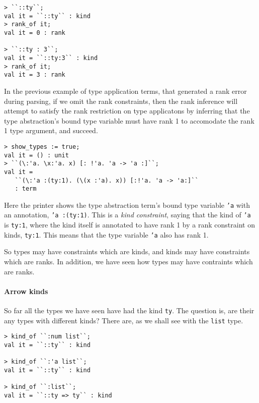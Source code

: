 \begin{session}
\begin{verbatim}
> ``::ty``;
val it = ``::ty`` : kind
> rank_of it;
val it = 0 : rank

> ``::ty : 3``;
val it = ``::ty:3`` : kind
> rank_of it;
val it = 3 : rank
\end{verbatim}
\end{session}

In the previous example of type application terms,
that generated a rank error during parsing,
if we omit the rank constraints, then the
rank inference will
attempt to satisfy
the rank restriction
on type applicatons
by inferring that
the type abstraction's bound type variable must have rank 1
to accomodate the rank 1 type argument, and succeed.
%
\begin{session}
\begin{verbatim}
> show_types := true;
val it = () : unit
> ``(\:'a. \x:'a. x) [: !'a. 'a -> 'a :]``;
val it =
   ``(\:'a :(ty:1). (\(x :'a). x)) [:!'a. 'a -> 'a:]``
   : term
\end{verbatim}
\end{session}

Here the printer shows the type abstraction term's bound type variable \texttt{'a}
with an annotation, \texttt{'a~{:}(ty{:}1)}.  This is a {\it kind constraint},
saying that the kind of \texttt{'a} is \texttt{ty{:}1}, where the kind
itself is annotated to have rank 1 by a rank constraint on kinds,
\texttt{ty{:}1}.  This means that the type variable \texttt{'a} also has
rank 1.

So types may have constraints which are kinds, and kinds may have constraints
which are ranks.  In addition, we have seen how types may have contraints
which are ranks.

\paragraph{Arrow kinds}

So far all the types we have seen have had the kind \texttt{ty}.
The question is, are their any types with different kinds?
There are, as we shall see with the \texttt{list} type.
%
\begin{session}
\begin{verbatim}
> kind_of ``:num list``;
val it = ``::ty`` : kind

> kind_of ``:'a list``;
val it = ``::ty`` : kind

> kind_of ``:list``;
val it = ``::ty => ty`` : kind
\end{verbatim}
\end{session}

